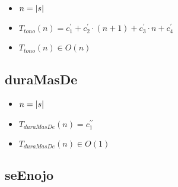 \documentclass{article}
\begin{document}
    \begin{itemize}
        \item $n = |s|$
        \item $T_{tono}(n) = c^{\prime}_1 +
                             c^{\prime}_2 \cdot (n + 1) +
                             c^{\prime}_3 \cdot n +
                             c^{\prime}_4 $
        \item $T_{tono}(n) \in O(n)$
    \end{itemize}

    \subsection*{duraMasDe}

    \begin{minipage}{0.70\textwidth}
        
    \end{minipage}
    \hfill
    \begin{minipage}{0.25\textwidth}
    \end{minipage}

    \begin{itemize}
        \item $n = |s|$
        \item $T_{duraMasDe}(n) = c^{\prime\prime}_1 $
        \item $T_{duraMasDe}(n) \in O(1)$
    \end{itemize}

    \newpage

    \subsection*{seEnojo}
\end{document}
